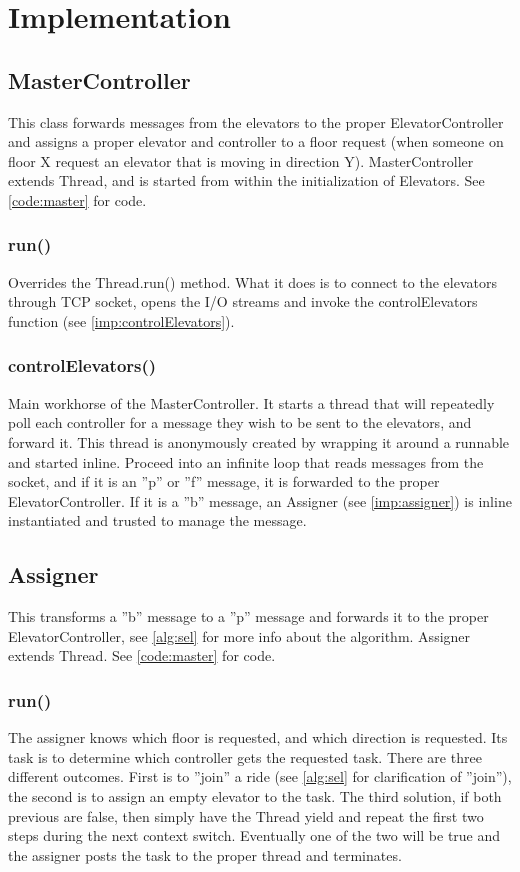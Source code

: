\section{Implementation}
\subsection{MasterController}
This class forwards messages from the elevators to the proper ElevatorController and assigns a proper elevator and controller to a floor request (when someone on floor X request an elevator that is moving in direction Y). MasterController extends Thread, and is started from within the initialization of Elevators. See \cref{code:master} for code.

\subsubsection{run()}
Overrides the Thread.run() method. What it does is to connect to the elevators through TCP socket, opens the I/O streams and invoke the controlElevators function (see \cref{imp:controlElevators}).

\subsubsection{controlElevators()}
Main workhorse of the MasterController. It starts a thread that will repeatedly poll each controller for a message they wish to be sent to the elevators, and forward it. This thread is anonymously created by wrapping it around a runnable and started inline. Proceed into an infinite loop that reads messages from the socket, and if it is an ''p'' or ''f'' message, it is forwarded to the proper ElevatorController. If it is a ''b'' message, an Assigner (see \cref{imp:assigner}) is inline instantiated and trusted to manage the message. 

\subsection{Assigner}
This transforms a ''b'' message to a ''p'' message and forwards it to the proper ElevatorController, see \cref{alg:sel} for more info about the algorithm.\newline
Assigner extends Thread. See \cref{code:master} for code.

\subsubsection{run()}
The assigner knows which floor is requested, and which direction is requested.\newline
Its task is to determine which controller gets the requested task. There are three different outcomes. First is to ''join'' a ride (see \cref{alg:sel} for clarification of ''join''), the second is to assign an empty elevator to the task. The third solution, if both previous are false, then simply have the Thread yield and repeat the first two steps during the next context switch. Eventually one of the two will be true and the assigner posts the task to the proper thread and terminates.

